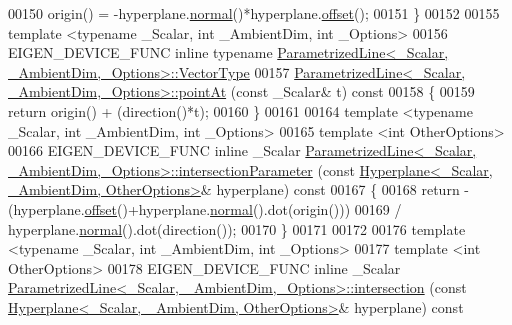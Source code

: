 \begin{DoxyCode}
00150   origin() = -hyperplane.\hyperlink{group___geometry___module_ad3da930fc7025604f2f174651089b2a8}{normal}()*hyperplane.\hyperlink{group___geometry___module_afe2eadf3679e4a802c0e02c15049aed9}{offset}();
00151 \}
00152 
00155 \textcolor{keyword}{template} <\textcolor{keyword}{typename} \_Scalar, \textcolor{keywordtype}{int} \_AmbientDim, \textcolor{keywordtype}{int} \_Options>
00156 EIGEN\_DEVICE\_FUNC \textcolor{keyword}{inline} \textcolor{keyword}{typename} 
      \hyperlink{group___core___module}{ParametrizedLine<\_Scalar, \_AmbientDim,\_Options>::VectorType}
00157 \hyperlink{group___geometry___module_ae0a510cc78156974ab5a7fb8a6b2326a}{ParametrizedLine<\_Scalar, \_AmbientDim,\_Options>::pointAt}
      (\textcolor{keyword}{const} \_Scalar& t)\textcolor{keyword}{ const}
00158 \textcolor{keyword}{}\{
00159   \textcolor{keywordflow}{return} origin() + (direction()*t); 
00160 \}
00161 
00164 \textcolor{keyword}{template} <\textcolor{keyword}{typename} \_Scalar, \textcolor{keywordtype}{int} \_AmbientDim, \textcolor{keywordtype}{int} \_Options>
00165 \textcolor{keyword}{template} <\textcolor{keywordtype}{int} OtherOptions>
00166 EIGEN\_DEVICE\_FUNC \textcolor{keyword}{inline} \_Scalar 
      \hyperlink{group___geometry___module_class_eigen_1_1_parametrized_line}{ParametrizedLine<\_Scalar, \_AmbientDim,\_Options>::intersectionParameter}
      (\textcolor{keyword}{const} \hyperlink{group___geometry___module_class_eigen_1_1_hyperplane}{Hyperplane<\_Scalar, \_AmbientDim, OtherOptions>}& 
      hyperplane)\textcolor{keyword}{ const}
00167 \textcolor{keyword}{}\{
00168   \textcolor{keywordflow}{return} -(hyperplane.\hyperlink{group___geometry___module_afe2eadf3679e4a802c0e02c15049aed9}{offset}()+hyperplane.\hyperlink{group___geometry___module_ad3da930fc7025604f2f174651089b2a8}{normal}().dot(origin()))
00169           / hyperplane.\hyperlink{group___geometry___module_ad3da930fc7025604f2f174651089b2a8}{normal}().dot(direction());
00170 \}
00171 
00172 
00176 \textcolor{keyword}{template} <\textcolor{keyword}{typename} \_Scalar, \textcolor{keywordtype}{int} \_AmbientDim, \textcolor{keywordtype}{int} \_Options>
00177 \textcolor{keyword}{template} <\textcolor{keywordtype}{int} OtherOptions>
00178 EIGEN\_DEVICE\_FUNC \textcolor{keyword}{inline} \_Scalar 
      \hyperlink{group___geometry___module_class_eigen_1_1_parametrized_line}{ParametrizedLine<\_Scalar, \_AmbientDim,\_Options>::intersection}
      (\textcolor{keyword}{const} \hyperlink{group___geometry___module_class_eigen_1_1_hyperplane}{Hyperplane<\_Scalar, \_AmbientDim, OtherOptions>}& 
      hyperplane)\textcolor{keyword}{ const}

\end{DoxyCode}

